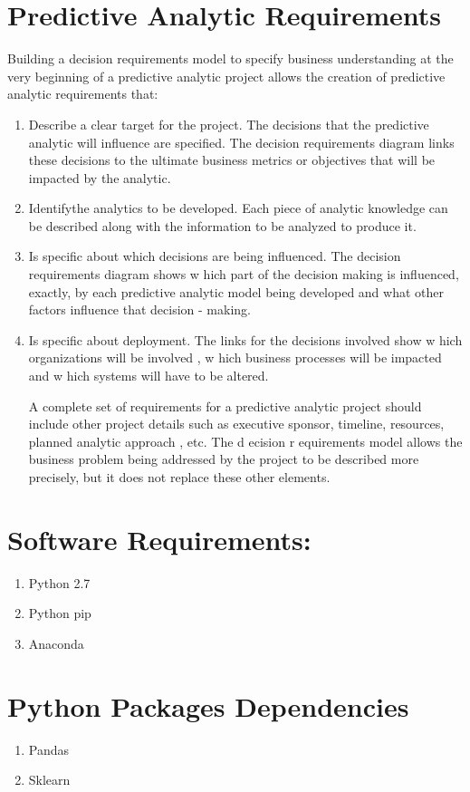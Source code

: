 \section{Predictive Analytic Requirements}
Building a decision requirements model 
to specify business understanding at the very beginning 
of 
a predictive analytic project allows the creation of predictive analytic requirements that:
\begin{enumerate} 
    \item Describe a clear target for the project. The decisions that the predictive analytic will 
influence are specified. The decision requirements diagram links these decisions to the ultimate business metrics or objectives that will be impacted by the analytic.
    
    \item Identifythe analytics to be developed. Each piece of analytic knowledge can be described along with the information to be analyzed to produce it.
    
    \item Is specific about which decisions are being influenced.
The decision requirements 
diagram shows w
hich part of the 
decision making is influenced, exactly, 
by each 
predictive analytic model being developed and what other factors influence that 
decision
-
making.
    
    \item Is specific about deployment.
The links for the decisions involved show w
hich 
organizations will be involved
, w
hich business processes will be impacted
and w
hich 
systems will have to be altered.

A complete set of requirements for a predictive analytic project 
should include other project 
details such as executive sponsor, timeline, resources, planned analytic approach
, 
etc. The 
d
ecision 
r
equirements 
model allows the business problem being addressed by the project to be described more precisely, but it does not replace these other elements.
    
\end{enumerate}

\section{Software Requirements:}
\begin{enumerate}
\item Python 2.7
\item Python pip
\item Anaconda
\end{enumerate}

\section{Python Packages Dependencies}
\begin{enumerate}
\item Pandas
\item Sklearn
\end{enumerate}
